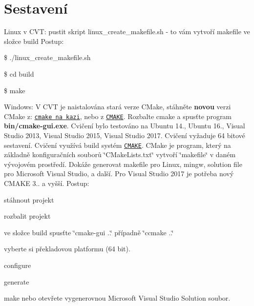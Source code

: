 \hypertarget{index_sestaveni}{}\section{Sestavení}\label{index_sestaveni}
Linux v C\+V\+T\+: pustit skript linux\+\_\+create\+\_\+makefile.\+sh -\/ to vám vytvoří makefile ve složce build Postup\+:
\begin{DoxyEnumerate}
\item \$ ./linux\+\_\+create\+\_\+makefile.sh
\item \$ cd build
\item \$ make
\end{DoxyEnumerate}

Windows\+: V C\+V\+T je naistalována stará verze C\+Make, stáhněte {\bfseries novou} verzi C\+Make z\+: \href{http://www.fit.vutbr.cz/~imilet/shared/cmake-3.11.1-win64-x64.zip}{\tt cmake na kazi}, nebo z \href{https://cmake.org/files/v3.11/cmake-3.11.1-win64-x64.zip}{\tt C\+M\+A\+K\+E}. Rozbalte cmake a spusťte program {\bfseries bin/cmake-\/gui.\+exe}.  Cvičení bylo testováno na Ubuntu 14., Ubuntu 16., Visual Studio 2013, Visual Studio 2015, Visual Studio 2017. Cvičení vyžaduje 64 bitové sestavení. Cvičení využívá build systém \href{https://cmake.org/}{\tt C\+M\+A\+K\+E}. C\+Make je program, který na základně konfiguračních souborů \char`\"{}\+C\+Make\+Lists.\+txt\char`\"{} vytvoří \char`\"{}makefile\char`\"{} v daném vývojovém prostředí. Dokáže generovat makefile pro Linux, mingw, solution file pro Microsoft Visual Studio, a další. Pro Visual Studio 2017 je potřeba nový C\+M\+A\+K\+E 3.. a vyšší. Postup\+:
\begin{DoxyEnumerate}
\item stáhnout projekt
\item rozbalit projekt
\item ve složce build spusťte \char`\"{}cmake-\/gui ..\char`\"{} případně \char`\"{}ccmake ..\char`\"{}
\item vyberte si překladovou platformu (64 bit).
\item configure
\item generate
\item make nebo otevřete vygenerovnou Microsoft Visual Studio Solution soubor.
\end{DoxyEnumerate}

